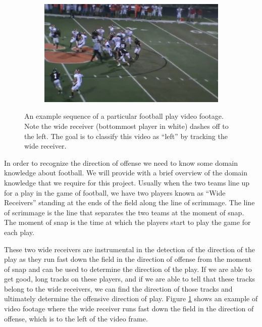 \documentclass{article} %
\begin{document}
{\begin{figure}
\begin{subfigure}{.24\textwidth}
 \end{subfigure}\hspace{.5em}%
 \begin{subfigure}{.24\textwidth}
  \centering
  \includegraphics[width=1\linewidth]{img/football_frame4.jpg}
 \end{subfigure}
\caption{An example sequence of a particular football play video footage. Note the wide receiver (bottommost player in white) dashes off to the left. The goal is to classify this video as ``left'' by tracking the wide receiver.}
\label{fig:football}
\end{figure}
}

In order to recognize the direction of offense we need to know some domain knowledge about football. We will provide with a brief overview of the domain knowledge that we require for this project. Usually when the two teams line up for a play in the game of football, we have two players known as ``Wide Receivers'' standing at the ends of the field along the line of scrimmage. The line of scrimmage is the line that separates the two teams at the moment of snap. The moment of snap is the time at which the players start to play the game for each play. 

These two wide receivers are instrumental in the detection of the direction of the play as they run fast down the field in the direction of offense from the moment of snap and can be used to determine the direction of the play. If we are able to get good, long tracks on these players, and if we are able to tell that these tracks belong to the wide receivers, we can find the direction of those tracks and ultimately determine the offensive direction of play. Figure \ref{fig:football} shows an example of video footage where the wide receiver runs fast down the field in the direction of offense, which is to the left of the video frame.
\end{document}
